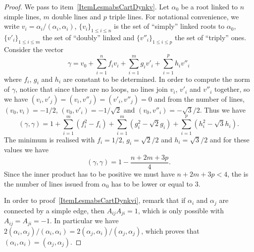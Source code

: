 \begin{proof}
	We pass to item~\ref{ItemLesmabsCartDynkv}. Let \( \alpha_0\) be a root linked to \( n\) simple lines, \( m\) double lines and \( p\) triple lines. For notational convenience, we write \( v_i=\alpha_i/(\alpha_i,\alpha_i)\), \( \{ v_i \}_{1\leq i\leq n}\) is the set of ``simply'' linked roots to \( \alpha_0\), \( \{ v'_i \}_{1\leq i\leq m}\) the set of ``doubly'' linked and \( \{ v''_i \}_{1\leq i\leq p}\) the set of ``triply'' ones. Consider the vector
	\begin{equation}
		\gamma=v_0+\sum_{i=1}^nf_iv_i+\sum_{i=1}^mg_iv'_i+\sum_{i=1}^ph_iv''_i
	\end{equation}
	where \( f_i\), \( g_i\) and \( h_i\) are constant to be determined. In order to compute the norm of \( \gamma\), notice that since there are no loops, no lines join \( v_i\), \( v'_i\) and \( v''_i\) together, so we have \( (v_i,v'_j)=(v_i,v''_j)=(v'_i,v''_j)=0\) and from the number of lines, \( (v_0,v_i)=-1/2\), \( (v_0,v'_i)=-1/\sqrt{2}\) and \( (v_0,v''_i)=-\sqrt{3}/2\). Thus we have
	\begin{equation}
		(\gamma,\gamma)=1+\sum_{i=1}^m(f_i^2-f_i)+\sum_{i=1}^m(g_i^2-\sqrt{2}g_i)+\sum_{i=1}^p(h_i^2-\sqrt{3}h_i).
	\end{equation}
	The minimum is realised with \( f_i=1/2\), \( g_i=\sqrt{2}/2\) and \( h_i=\sqrt{3}/2\) and for these values we have
	\begin{equation}
		(\gamma,\gamma)=1-\frac{ n+2m+3p }{ 4 }.
	\end{equation}
	Since the inner product has to be positive we must have \( n+2m+3p<4\), the is the number of lines issued from \( \alpha_0\) has to be lower or equal to \( 3\).

	In order to proof~\ref{ItemLesmabsCartDynkvi}, remark that if \( \alpha_i\) and \( \alpha_j\) are connected by a simple edge, then \( A_{ij}A_{ji}=1\), which is only possible with \( A_{ij}=A_{ji}=-1\). In particular we have \( 2(\alpha_i,\alpha_j)/(\alpha_i,\alpha_i)=2(\alpha_j,\alpha_i)/(\alpha_j,\alpha_j)\), which proves that \( (\alpha_i,\alpha_i)=(\alpha_j,\alpha_j)\).


\end{proof}
